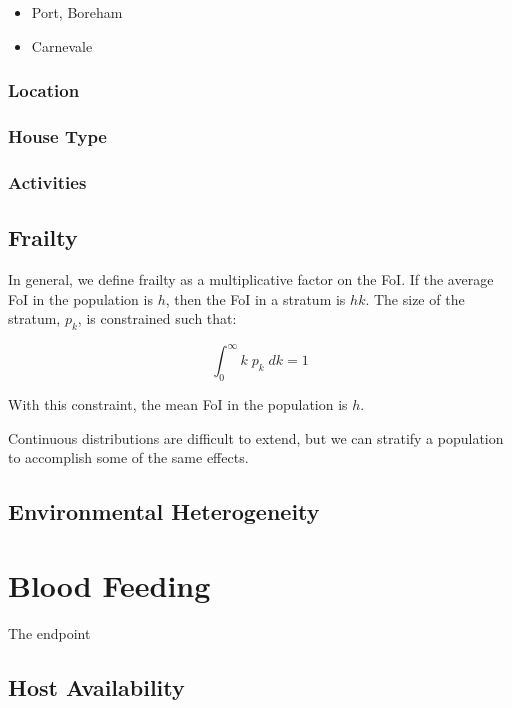 \documentclass[
]{book}
\begin{document}
\begin{itemize}
\item
  Port, Boreham
\item
  Carnevale
\end{itemize}

\hypertarget{location}{%
\subsection{Location}\label{location}}

\hypertarget{house-type}{%
\subsection{House Type}\label{house-type}}

\hypertarget{activities}{%
\subsection{Activities}\label{activities}}

\hypertarget{frailtyCh}{%
\section{Frailty}\label{frailtyCh}}

In general, we define frailty as a multiplicative factor on the FoI. If the average FoI in the population is \(h\), then the FoI in a stratum is \(hk\). The size of the stratum, \(p_k\), is constrained such that:

\[\int_0^\infty k \; p_k \; dk = 1\]

With this constraint, the mean FoI in the population is \(h\).

Continuous distributions are difficult to extend, but we can stratify a population to accomplish some of the same effects.

\hypertarget{environmentalHeterogeneity}{%
\section{Environmental Heterogeneity}\label{environmentalHeterogeneity}}

\hypertarget{blood-feeding-1}{%
\chapter{Blood Feeding}\label{blood-feeding-1}}

The endpoint

\hypertarget{host-availability}{%
\section{Host Availability}\label{host-availability}}
\end{document}
